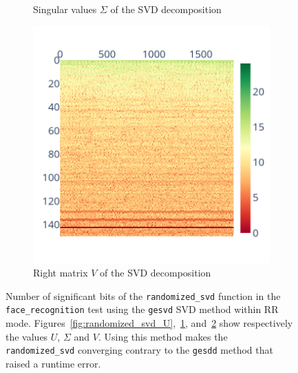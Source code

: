 \documentclass[11pt]{article}
\begin{document}
\begin{figure}
\begin{subfigure}{0.3\linewidth}
    \caption{Singular values $\Sigma$ of the SVD decomposition}
    \label{fig:randomized_svd_S}
    \end{subfigure}
    \begin{subfigure}{0.3\linewidth}
    \includegraphics[width=\linewidth]{figure/face_recognition/randomized_svd_ret_V_sig_zoom.png}
    \caption{Right matrix $V$ of the SVD decomposition}
    \label{fig:randomized_svd_V}
    \end{subfigure}
    \caption{Number of significant bits of the \texttt{randomized\_svd} function in the 
    \texttt{face\_recognition} test using the \texttt{gesvd} SVD method within RR mode.
    Figures~\ref{fig:randomized_svd_U},~\ref{fig:randomized_svd_S}, and~\ref{fig:randomized_svd_V}
    show respectively the values $U$, $\Sigma$ and $V.$
    Using this method makes the \texttt{randomized\_svd} converging contrary to the \texttt{gesdd} method that raised a runtime error. 
    }
    \label{fig:face_recognition_svd}
\end{figure}



\end{document}
